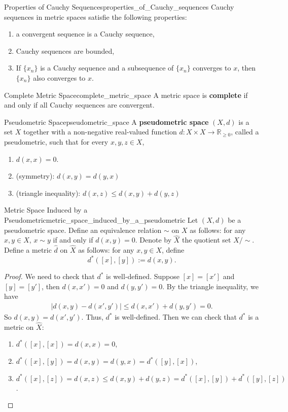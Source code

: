 \documentclass{report}
\begin{document}
\begin{proposition}{Properties of Cauchy Sequences}{properties_of_Cauchy_sequences}
	Cauchy sequences in metric spaces satisfie the following properties:
	\begin{enumerate}
		\item a convergent sequence is a Cauchy sequence,
		\item Cauchy sequences are bounded,
		\item If $\{x_n\}$ is a Cauchy sequence and a subsequence of $\{x_n\}$ converges to $x$, then $\{x_n\}$ also converges to $x$.
	\end{enumerate}	
\end{proposition}

\begin{definition}{Complete Metric Space}{complete_metric_space}
	A metric space is \textbf{complete} if and only if all Cauchy sequences are convergent.
\end{definition}

\begin{definition}{Pseudometric Space}{pseudometric_space}
	A \textbf{pseudometric space} $(X, d)$ is a set $X$ together with a non-negative real-valued function $d: X \times X \longrightarrow \mathbb{R}_{\geq 0}$, called a pseudometric, such that for every $x, y, z \in X$,
	\begin{enumerate}
		\item $d(x, x)=0$.
		\item (symmetry): $d(x, y)=d(y, x)$
		\item (triangle inequality): $d(x, z) \leq d(x, y)+d(y, z)$
	\end{enumerate}
\end{definition}

\begin{definition}{Metric Space Induced by a Pseudometric}{metric_space_induced_by_a_pseudometric}
	Let $(X,d)$ be a pseudometric space. Define an equivalence relation $\sim$ on $X$ as follows: for any $x,y\in X$, $x\sim y$ if and only if $d(x,y)=0$. Denote by $\widehat{X}$ the quotient set $X/\sim$. Define a metric $\hat{d}$ on $\widehat{X}$ as follows: for any $x,y\in X$, define
	\[
		d^*([x],[y]):=d(x,y).
	\]
\end{definition}
\begin{proof}
	We need to check that $d^*$ is well-defined. Suppose $[x]=[x']$ and $[y]=[y']$, then $d(x,x')=0$ and $d(y,y')=0$. By the triangle inequality, we have
	\begin{align*}
		|d(x,y)-d(x',y')|\le d(x,x')+d(y,y')=0.
	\end{align*}
	So $d(x,y)=d(x',y')$. Thus, $d^*$ is well-defined. 
	Then we can check that $d^*$ is a metric on $\widehat{X}$:
	\begin{enumerate}
		\item $d^*([x],[x])=d(x,x)=0$,
		\item $d^*([x],[y])=d(x,y)=d(y,x)=d^*([y],[x])$,
		\item $d^*([x],[z])=d(x,z)\le d(x,y)+d(y,z)=d^*([x],[y])+d^*([y],[z])$.
	\end{enumerate}
\end{proof}
\end{document}

